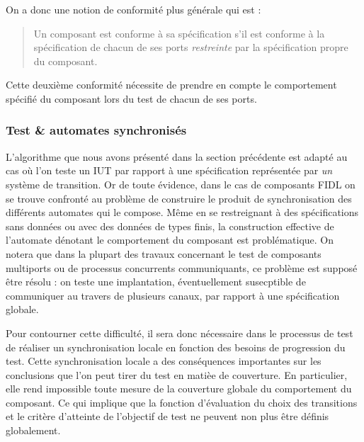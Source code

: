 On a donc une notion de conformit\'e plus g\'en\'erale qui est : 
\begin{quote}
    Un composant est conforme \`a sa sp\'ecification s'il est
    conforme \`a la sp\'ecification de chacun de ses ports
    \emph{restreinte} par la sp\'ecification propre du composant.
\end{quote}
Cette deuxi\`eme conformit\'e n\'ecessite de prendre en compte le
comportement sp\'ecifi\'e du composant lors du test de chacun de ses
ports. 

\subsubsection{Test \& automates synchronis\'es}

L'algorithme que nous avons pr\'esent\'e dans la section
pr\'ec\'edente est adapt\'e au cas o\`u l'on teste un \textsf{IUT}
par rapport \`a une sp\'ecification repr\'esent\'ee par \emph{un}
syst\`eme de transition. Or de toute \'evidence, dans le cas de
composants \textsf{FIDL} on se trouve confront\'e au probl\`eme de
construire le produit de synchronisation des
diff\'erents automates qui le compose. M\^eme en se restreignant
\`a des sp\'ecifications sans donn\'ees ou avec des donn\'ees
de types finis, la construction effective de l'automate d\'enotant le
comportement du composant est probl\'ematique. On notera que dans
la plupart des travaux concernant le test de composants multiports ou de
processus concurrents communiquants, ce probl\`eme est suppos\'e
\^etre r\'esolu : on teste une implantation, \'eventuellement
susecptible de communiquer au travers de plusieurs canaux, par rapport
\`a une sp\'ecification globale. 

Pour contourner cette
difficult\'e, il sera donc n\'ecessaire dans le processus de test de
r\'ealiser un synchronisation locale en fonction des besoins de
progression du test. Cette synchronisation locale a des
cons\'equences importantes sur les conclusions que l'on peut tirer
du test en mati\`ee de couverture. En particulier, elle rend
impossible toute mesure de la couverture globale du comportement du
composant. Ce qui implique que la fonction d'\'evaluation du choix
des transitions et le crit\`ere d'atteinte de l'objectif de test ne
peuvent non plus \^etre d\'efinis globalement. 

